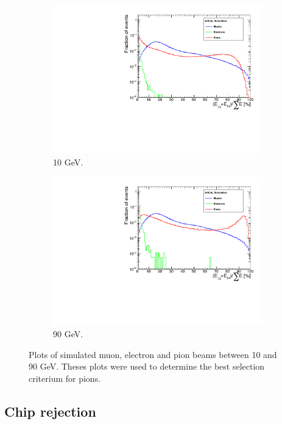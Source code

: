 \begin{figure}[htbp!]
\begin{subfigure}[t]{0.5\textwidth}
		\includegraphics[width=1\linewidth]{chap5/fig_AHCAL_timing/Pions/SelectionCut_EnergyLastLayers_10GeV}
		\caption{10 GeV.} \label{fig:pi10GeV_Elast}
	\end{subfigure}
	\hfill
	\begin{subfigure}[t]{0.5\textwidth}
		\centering
		\includegraphics[width=1\linewidth]{chap5/fig_AHCAL_timing/Pions/SelectionCut_EnergyLastLayers_90GeV}
		\caption{90 GeV.} \label{fig:pi90GeV_Elast}
	\end{subfigure}
	\caption{Plots of simulated muon, electron and pion beams between 10 and 90 GeV. Theses plots were used to determine the best selection criterium for pions.} \label{fig:pionselection}
\end{figure}

\subsection{Chip rejection}


